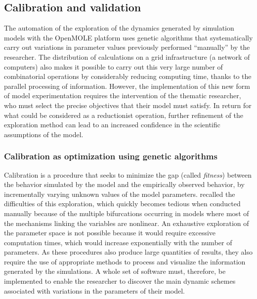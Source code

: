 \documentclass[10pt]{article}
\begin{document}
\subsection{Calibration and validation}


The automation of the exploration of the dynamics generated by simulation models with the OpenMOLE platform uses genetic algorithms that systematically carry out variations in parameter values previously performed ``manually'' by the researcher. The distribution of calculations on a grid infrastructure (a network of computers) also makes it possible to carry out this very large number of combinatorial operations by considerably reducing computing time, thanks to the parallel processing of information. However, the implementation of this new form of model experimentation requires the intervention of the thematic researcher, who must select the precise objectives that their model must satisfy. In return for what could be considered as a reductionist operation, further refinement of the exploration method can lead to an increased confidence in the scientific assumptions of the model.


\subsubsection{Calibration as optimization using genetic algorithms}

Calibration is a procedure that seeks to minimize the gap (called \emph{fitness}) between the behavior simulated by the model and the empirically observed behavior, by incrementally varying unknown values of the model parameters. \cite{stonedahl2011genetic} recalled the difficulties of this exploration, which quickly becomes tedious when conducted manually because of the multiple bifurcations occurring in models where most of the mechanisms linking the variables are nonlinear. An exhaustive exploration of the parameter space is not possible because it would require excessive computation times, which would increase exponentially with the number of parameters. As these procedures also produce large quantities of results, they also require the use of appropriate methods to process and visualize the information generated by the simulations. A whole set of software must, therefore, be implemented to enable the researcher to discover the main dynamic schemes associated with variations in the parameters of their model.
\end{document}

